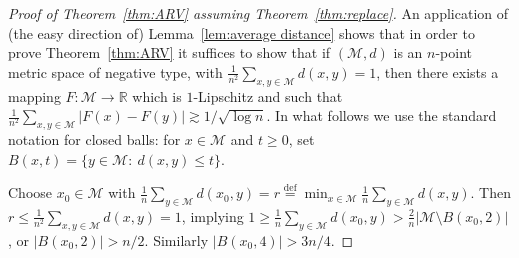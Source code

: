 \documentclass{icm2010}
\theoremstyle{definition}
\newcommand{\R}{\mathbb{R}}
\newcommand{\eqdef}{\stackrel{\mathrm{def}}{=}}
\newcommand{\1}{\mathbf{1}}
\newcommand{\M}{\mathscr{M}}
\renewcommand{\le}{\leqslant}
\renewcommand{\ge}{\geqslant}
\begin{document}
\begin{proof}[Proof of Theorem~\ref{thm:ARV} assuming Theorem~\ref{thm:replace}]
An application of (the easy direction of) Lemma~\ref{lem:average distance} shows that in order to prove Theorem~\ref{thm:ARV} it suffices to show that if $(\M,d)$ is an $n$-point metric space of negative type, with $\frac{1}{n^2}\sum_{x,y\in \M}d(x,y)=1$, then there exists a mapping $F:\M\to \R$ which is $1$-Lipschitz and such that $\frac{1}{n^2}\sum_{x,y\in \M}|F(x)-F(y)|\gtrsim 1/\sqrt{\log n}$. In what follows we use the standard notation for closed balls: for $x\in \M$ and $t\ge 0$, set $B(x,t)=\{y\in \M:\ d(x,y)\le t\}$.


Choose $x_0\in \M$ with $\frac{1}{n}\sum_{y\in \M} d(x_0,y)=r\eqdef
\min_{x\in \M}\frac{1}{n}\sum_{y\in \M} d(x,y)$.  Then $r\le
\frac{1}{n^2}\sum_{x,y\in \M} d(x,y)=1$, implying $1\ge
\frac{1}{n}\sum_{y\in \M} d(x_0,y)> \frac{2}{n}|\M\setminus
B(x_0,2)|$, or $|B(x_0,2)|> n/2$. Similarly $|B(x_0,4)|> 3n/4$.


\end{proof}
\end{document}
